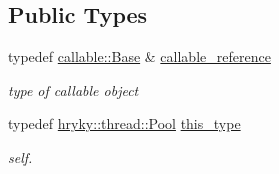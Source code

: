 \subsection*{Public Types}
\begin{DoxyCompactItemize}
\item 
\hypertarget{classhryky_1_1thread_1_1_pool_adf3dc9b77ef4669d18ed2229c9b5697d}{typedef \hyperlink{classhryky_1_1thread_1_1callable_1_1_base}{callable\-::\-Base} \& \hyperlink{classhryky_1_1thread_1_1_pool_adf3dc9b77ef4669d18ed2229c9b5697d}{callable\-\_\-reference}}\label{classhryky_1_1thread_1_1_pool_adf3dc9b77ef4669d18ed2229c9b5697d}

\begin{DoxyCompactList}\small\item\em type of callable object \end{DoxyCompactList}\item 
\hypertarget{classhryky_1_1thread_1_1_pool_a969ac19770a6e83266c32e28f9c85589}{typedef \hyperlink{classhryky_1_1thread_1_1_pool}{hryky\-::thread\-::\-Pool} \hyperlink{classhryky_1_1thread_1_1_pool_a969ac19770a6e83266c32e28f9c85589}{this\-\_\-type}}\label{classhryky_1_1thread_1_1_pool_a969ac19770a6e83266c32e28f9c85589}

\begin{DoxyCompactList}\small\item\em self. \end{DoxyCompactList}\end{DoxyCompactItemize}
